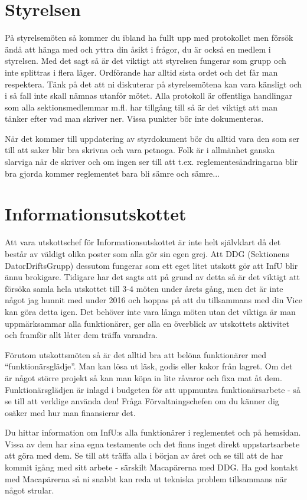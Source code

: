 \documentclass[10pt]{article}
\begin{document}
\section{Styrelsen}
På styrelsemöten så kommer du ibland ha fullt upp med protokollet men försök ändå att hänga med och yttra din åsikt i frågor, du är också en medlem i styrelsen. Med det sagt så är det viktigt att styrelsen fungerar som grupp och inte splittras i flera läger. Ordförande har alltid sista ordet och det får man respektera. Tänk på det att ni diskuterar på styrelsemötena kan vara känsligt och i så fall inte skall nämnas utanför mötet. Alla protokoll är offentliga handlingar som alla sektionsmedlemmar m.fl. har tillgång till så är det viktigt att man tänker efter vad man skriver ner. Vissa punkter bör inte dokumenteras.

När det kommer till uppdatering av styrdokument bör du alltid vara den som ser till att saker blir bra skrivna och vara petnoga. Folk är i allmänhet ganska slarviga när de skriver och om ingen ser till att t.ex. reglementesändringarna blir bra gjorda kommer reglementet bara bli sämre och sämre...

\section{Informationsutskottet}
Att vara utskottschef för Informationsutskottet är inte helt självklart då det består av väldigt olika poster som alla gör sin egen grej. Att DDG (Sektionens DatorDriftsGrupp) dessutom fungerar som ett eget litet utskott gör att InfU blir ännu brokigare. Tidigare har det sagts att på grund av detta så är det viktigt att försöka samla hela utskottet till 3-4 möten under årets gång, men det är inte något jag hunnit med under 2016 och hoppas på att du tillsammans med din Vice kan göra detta igen. Det behöver inte vara långa möten utan det viktiga är man uppmärksammar alla funktionärer, ger alla en överblick av utskottets aktivitet och framför allt låter dem träffa varandra.

Förutom utskottsmöten så är det alltid bra att belöna funktionärer med ``funktionärsglädje''. Man kan lösa ut läsk, godis eller kakor från lagret. Om det är något större projekt så kan man köpa in lite råvaror och fixa mat åt dem. Funktionärsglädjen är inlagd i budgeten för att uppmuntra funktionärsarbete - så se till att verklige använda den! Fråga Förvaltningschefen om du känner dig osäker med hur man finansierar det.

Du hittar information om InfU:s alla funktionärer i reglementet och på hemsidan. Vissa av dem har sina egna testamente och det finns inget direkt uppstartsarbete att göra med dem. Se till att träffa alla i början av året och se till att de har kommit igång med sitt arbete - särskilt Macapärerna med DDG. Ha god kontakt med Macapärerna så ni snabbt kan reda ut tekniska problem tillsammans när något strular.
\end{document}
